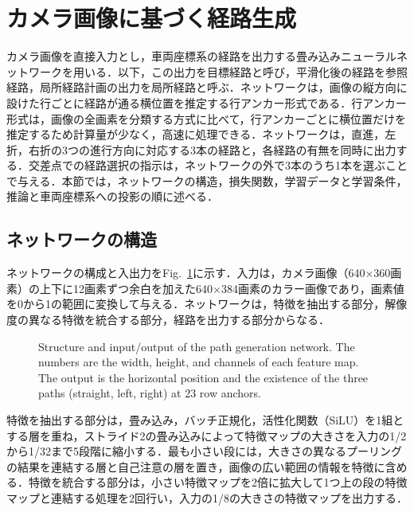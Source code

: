 \section{カメラ画像に基づく経路生成}
\label{sec:vision_planner}
カメラ画像を直接入力とし，車両座標系の経路を出力する畳み込みニューラルネットワークを用いる．以下，この出力を目標経路と呼び，平滑化後の経路を参照経路，局所経路計画の出力を局所経路と呼ぶ．ネットワークは，画像の縦方向に設けた行ごとに経路が通る横位置を推定する行アンカー形式\cite{qin2020}である．行アンカー形式は，画像の全画素を分類する方式に比べて，行アンカーごとに横位置だけを推定するため計算量が少なく，高速に処理できる\cite{qin2020}．ネットワークは，直進，左折，右折の3つの進行方向に対応する3本の経路と，各経路の有無を同時に出力する．交差点での経路選択の指示は，ネットワークの外で3本のうち1本を選ぶことで与える．本節では，ネットワークの構造，損失関数，学習データと学習条件，推論と車両座標系への投影の順に述べる．

\subsection{ネットワークの構造}
\label{sec:network}
ネットワークの構成と入出力をFig.~\ref{fig:network}に示す．入力は，カメラ画像（640$\times$360画素）の上下に12画素ずつ余白を加えた640$\times$384画素のカラー画像であり，画素値を0から1の範囲に変換して与える．ネットワークは，特徴を抽出する部分，解像度の異なる特徴を統合する部分，経路を出力する部分からなる．

\begin{figure}[H]
  \centering
  \resizebox{\textwidth}{!}{}
  \caption[Structure and input/output of the path generation network.]{Structure and input/output of the path generation network. The numbers are the width, height, and channels of each feature map. The output is the horizontal position and the existence of the three paths (straight, left, right) at 23 row anchors.}
  \label{fig:network}
\end{figure}

特徴を抽出する部分は，畳み込み，バッチ正規化，活性化関数（SiLU）を1組とする層を重ね，ストライド2の畳み込みによって特徴マップの大きさを入力の1/2から1/32まで5段階に縮小する．最も小さい段には，大きさの異なるプーリングの結果を連結する層と自己注意の層を置き，画像の広い範囲の情報を特徴に含める．特徴を統合する部分は，小さい特徴マップを2倍に拡大して1つ上の段の特徴マップと連結する処理を2回行い，入力の1/8の大きさの特徴マップを出力する．

